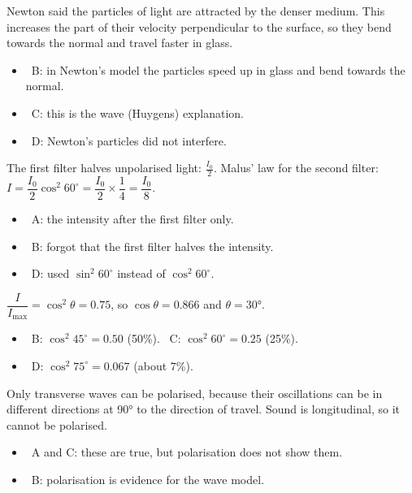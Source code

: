 \documentclass[12pt]{article}
\begin{document}
\begin{practiceanswers}
\begin{practiceans}
  Newton said the particles of light are attracted by the denser medium. This increases the part of
  their velocity perpendicular to the surface, so they bend towards the normal and travel faster in
  glass.
  \begin{itemize}
    \item \xmark\ B: in Newton's model the particles speed up in glass and bend towards the normal.
    \item \xmark\ C: this is the wave (Huygens) explanation.
    \item \xmark\ D: Newton's particles did not interfere.
  \end{itemize}
\end{practiceans}

\begin{practiceans}
  The first filter halves unpolarised light: $\frac{I_0}{2}$. Malus' law for the second filter:
  $I = \dfrac{I_0}{2}\cos^2 60^\circ = \dfrac{I_0}{2} \times \dfrac{1}{4} = \dfrac{I_0}{8}$.
  \begin{itemize}
    \item \xmark\ A: the intensity after the first filter only.
    \item \xmark\ B: forgot that the first filter halves the intensity.
    \item \xmark\ D: used $\sin^2 60^\circ$ instead of $\cos^2 60^\circ$.
  \end{itemize}
\end{practiceans}

\begin{practiceans}
  $\dfrac{I}{I_\mathrm{max}} = \cos^2\theta = 0.75$, so $\cos\theta = 0.866$ and $\theta = \ang{30}$.
  \begin{itemize}
    \item \xmark\ B: $\cos^2 45^\circ = 0.50$ (50\%). \quad \xmark\ C: $\cos^2 60^\circ = 0.25$ (25\%).
    \item \xmark\ D: $\cos^2 75^\circ = 0.067$ (about 7\%).
  \end{itemize}
\end{practiceans}

\begin{practiceans}
  Only transverse waves can be polarised, because their oscillations can be in different directions
  at \ang{90} to the direction of travel. Sound is longitudinal, so it cannot be polarised.
  \begin{itemize}
    \item \xmark\ A and C: these are true, but polarisation does not show them.
    \item \xmark\ B: polarisation is evidence for the wave model.
  \end{itemize}
\end{practiceans}


\end{practiceanswers}
\end{document}
